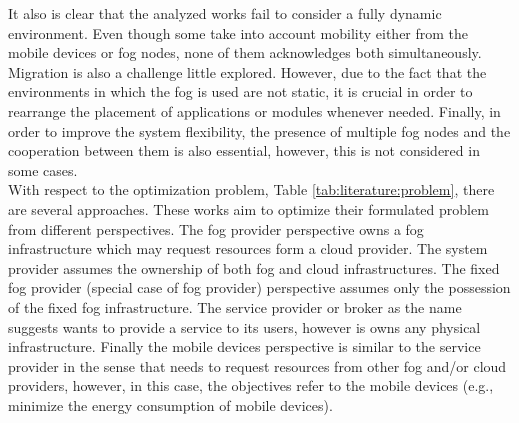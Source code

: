 It also is clear that the analyzed works fail to consider a fully dynamic environment. Even though some take into account mobility either from the mobile devices or fog nodes, none of them acknowledges both simultaneously. Migration is also a challenge little explored. However, due to the fact that the environments in which the fog is used are not static, it is crucial in order to rearrange the placement of applications or modules whenever needed. Finally, in order to improve the system flexibility, the presence of multiple fog nodes and the cooperation between them is also essential, however, this is not considered in some cases. \\
\noindent\tab With respect to the optimization problem, Table \ref{tab:literature:problem}, there are several approaches. 
These works aim to optimize their formulated problem from different perspectives. The fog provider perspective owns a fog infrastructure which may request resources form a cloud provider. The system provider assumes the ownership of both fog and cloud infrastructures. The fixed fog provider (special case of fog provider) perspective assumes only the possession of the fixed fog infrastructure. The service provider or broker as the name suggests wants to provide a service to its users, however is owns any physical infrastructure. Finally the mobile devices perspective is similar to the service provider in the sense that needs to request resources from other fog and/or cloud providers, however, in this case, the objectives refer to the mobile devices (e.g., minimize the energy consumption of mobile devices).\\
